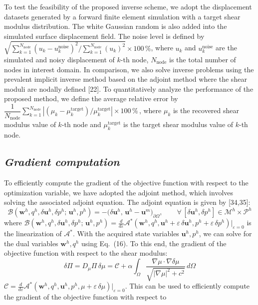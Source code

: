\documentclass[11pt]{article}
\begin{document}
To test the feasibility of the proposed inverse scheme, we adopt the
displacement datasets generated by a forward finite element
simulation with a target shear modulus distribution. The white
Gaussian random is also added into the simulated surface displacement
field. The noise level is defined by
$\sqrt{\displaystyle\sum_{k=1}^{N_{\text{node}}}
\left(u_k - u_k^{\text{noise}}\right)^{\!2}\bigg/
\sum_{k=1}^{N_{\text{node}}} (u_k)^{2}} \times 100\,\%$,
where $u_k$ and $u_k^{\text{noise}}$ are the simulated and noisy
displacement of $k$-th node, $N_{\text{node}}$ is the total number of
nodes in interest domain. In comparison, we also solve inverse
problems using the prevalent implicit inverse method based on the
adjoint method where the shear moduli are nodally defined [22]. To
quantitatively analyze the performance of the proposed method, we
define the average relative error by
$\dfrac{1}{N_{\text{node}}}
\displaystyle\sum_{k=1}^{N_{\text{node}}}
\left|\left(\mu_k - \mu_k^{\text{target}}\right)
\big/ \mu_k^{\text{target}}\right| \times 100\,\%$\,,
where $\mu_k$ is the recovered shear modulus value of $k$-th node
and $\mu_k^{\text{target}}$ is the target shear modulus value of
$k$-th node.

\subsection*{\textit{Gradient computation}}

\noindent
To efficiently compute the gradient of the objective function with
respect to the optimization variable, we have adopted the adjoint
method, which involves solving the associated adjoint equation. The
adjoint equation is given by [34,35]:
\begin{equation}
\mathscr{B}\!\left(\mathbf{w}^h, q^h, \delta\mathbf{u}^h, \delta p^h
;\, \mathbf{u}^h, p^h\right)
= -\bigl(\delta\mathbf{u}^h,\,
         \mathbf{u}^h - \mathbf{u}^{m}\bigr)_{\partial\Omega},
\qquad
\forall\,[\delta\mathbf{u}^h, \delta p^h]
\in \mathscr{M}^h \times \mathscr{P}^h
\end{equation}
where
$\mathscr{B}(\mathbf{w}^h, q^h, \delta\mathbf{u}^h, \delta p^h;\,
\mathbf{u}^h, p^h) = \frac{d}{d\varepsilon}
\mathscr{A}^{*}\!(\mathbf{w}^h, q^h, \mathbf{u}^h
+ \varepsilon\,\delta\mathbf{u}^h, p^h
+ \varepsilon\,\delta p^h)\big|_{\varepsilon=0}$
is the linearization of $\mathscr{A}^{*}$. With the acquired state
variables $\mathbf{u}^h, p^h$, we can solve for the dual variables
$\mathbf{w}^h, q^h$ using Eq.~(16). To this end, the gradient of the
objective function with respect to the shear modulus:
\begin{equation}
\delta\Pi = D_{\mu}\Pi\,\delta\mu = \mathscr{C}
+ \alpha \int_{\Omega}
\dfrac{\nabla\mu \cdot \nabla\delta\mu}
      {\sqrt{|\nabla\mu|^{2} + c^{2}}}\, d\Omega
\end{equation}
$\mathscr{C} = \frac{d}{d\varepsilon}
\mathscr{A}^{*}\!(\mathbf{w}^h, q^h, \mathbf{u}^h, p^h,
\mu + \varepsilon\,\delta\mu)\big|_{\varepsilon=0}$.
This can be used to efficiently compute the gradient of the objective
function with respect to
\end{document}
